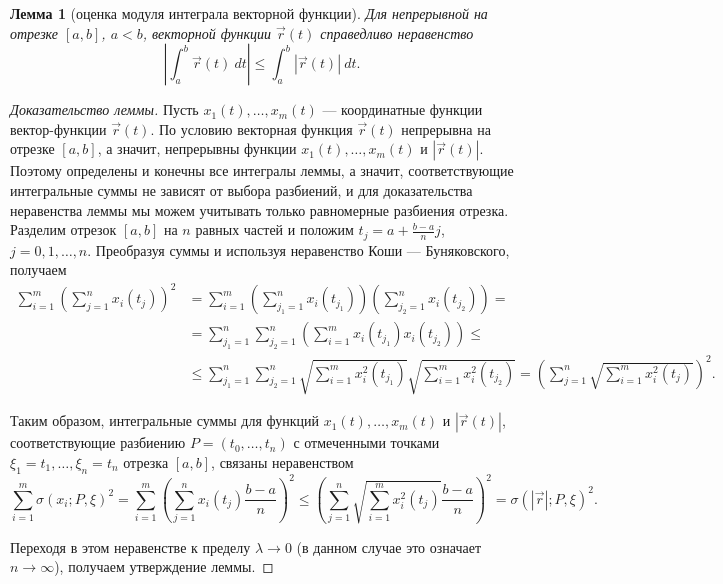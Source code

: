 \documentclass[12pt]{report}
\numberwithin{equation}{section}
\newtheorem{lemma}{Лемма}[section]
\begin{document}
\begin{lemma}[оценка модуля интеграла векторной функции] \label{lemm:19:1}
Для непрерывной на отрезке $[a,b]$, $a < b$, векторной функции $\vec{r}(t)$ справедливо неравенство
\[ \left| \int_a^b \vec{r}(t)~dt \right| \leqslant \int_a^b |\vec{r}(t)|~dt.\]
\end{lemma}
\begin{proof}[Доказательство леммы] Пусть $x_1(t),\ldots,x_m(t)$ --- координатные функции вектор-функции $\vec{r}(t)$. По условию векторная функция $\vec{r}(t)$ непрерывна на отрезке $[a,b]$, а значит, непрерывны функции $x_1(t), \ldots, x_m(t)$ и $|\vec{r}(t)|$. Поэтому определены и конечны все интегралы леммы, а значит, соответствующие интегральные суммы не зависят от выбора разбиений, и для доказательства неравенства леммы мы можем учитывать только равномерные разбиения отрезка. Разделим отрезок $[a,b]$ на $n$ равных частей и положим $t_j = a + \frac{b-a}{n}j$, $j = 0,1,\ldots,n$. Преобразуя суммы и используя неравенство Коши --- Буняковского, получаем
\[
\begin{aligned}
\sum_{i=1}^m \left( \sum_{j=1}^n x_i(t_j) \right)^2&= \sum_{i=1}^m\left( \sum_{j_1 = 1}^n x_i (t_{j_1}) \right) \left( \sum_{j_2 = 1}^n x_i (t_{j_2}) \right) =\\
&= \sum_{j_1 = 1}^n \sum_{j_2 = 1}^n \left( \sum_{i=1}^m x_i (t_{j_1}) x_i (t_{j_2}) \right) \leqslant\\
&\leqslant \sum_{j_1 = 1}^n \sum_{j_2 = 1}^n \sqrt{\sum_{i=1}^m x_i^2 (t_{j_1})} \sqrt{\sum_{i=1}^m x_i^2 (t_{j_2})} = \left( \sum_{j=1}^n \sqrt{\sum_{i=1}^m x_i^2 (t_j)}\right)^2.
\end{aligned}\]

Таким образом, интегральные суммы для функций $x_1(t), \ldots, x_m(t)$ и $|\vec{r}(t)|$, соответствующие разбиению $P = (t_0, \ldots, t_n)$ с отмеченными точками $\xi_1 = t_1, \ldots, \xi_n = t_n$ отрезка $[a,b]$, связаны неравенством
\[\sum_{i=1}^m \sigma(x_i; P, \xi)^2 = \sum_{i=1}^m \left( \sum_{j=1}^n x_i (t_j) \frac{b-a}{n}\right)^2 \leqslant \left( \sum_{j=1}^n \sqrt{\sum_{i=1}^m x_i^2 (t_j)} \frac{b-a}{n}\right)^2 = \sigma(|\vec{r}|; P, \xi)^2.\]

Переходя в этом неравенстве к пределу $\lambda \to 0$ (в данном случае это означает $n \to \infty$), получаем утверждение леммы.
\end{proof}
\end{document}
